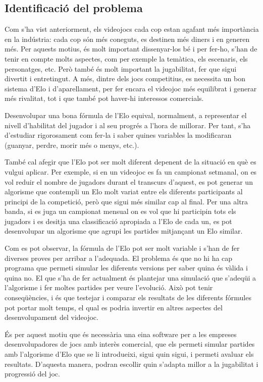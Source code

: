 \documentclass[a4paper]{article}
\begin{document}
\newpage
\subsection{Identificació del problema}
Com s'ha vist anteriorment, els videojocs cada cop estan agafant més importància en la indústria: cada cop són més coneguts, es destinen més diners i en generen més. Per aquests motius, és molt important dissenyar-los bé i per fer-ho, s'han de tenir en compte molts aspectes, com per exemple la temàtica, els escenaris, els personatges, etc. Però també és molt important la jugabilitat, fer que sigui divertit i entretingut. A més, dintre dels jocs competitius, es necessita un bon sistema d'Elo i d'aparellament, per fer encara el videojoc més equilibrat i generar més rivalitat, tot i que també pot haver-hi interessos comercials.

Desenvolupar una bona fórmula de l'Elo equival, normalment, a representar el nivell d'habilitat del jugador i al seu progrés a l'hora de millorar. Per tant, s'ha d'estudiar rigorosament com fer-la i saber quines variables la modificaran (guanyar, perdre, morir més o menys, etc.).

També cal afegir que l'Elo pot ser molt diferent depenent de la situació en què es vulgui aplicar. Per exemple, si en un videojoc es fa un campionat setmanal, on es vol reduir el nombre de jugadors durant el transcurs d'aquest, es pot generar un algorisme que contempli un Elo molt variat entre els diferents participants al principi de la competició, però que sigui més similar cap al final. Per una altra banda, si es juga un campionat mensual on es vol que hi participin tots els jugadors i es desitja una classificació apropiada a l'Elo de cada un, es pot desenvolupar un algorisme que agrupi les partides mitjançant un Elo similar.

Com es pot observar, la fórmula de l'Elo pot ser molt variable i s'han de fer diverses proves per arribar a l'adequada. El problema és que no hi ha cap programa que permeti simular les diferents versions per saber quina és vàlida i quina no. El que s'ha de fer actualment és plantejar una simulació que s'adeqüi a l'algorisme i fer moltes partides per veure l'evolució. Això pot tenir conseqüències, i és que testejar i comparar els resultats de les diferents fórmules pot portar molt temps, el qual es podria invertir en altres aspectes del desenvolupament del videojoc. 

És per aquest motiu que és necessària una eina software per a les empreses desenvolupadores de jocs amb interès comercial, que els permeti simular partides amb l'algorisme d'Elo que se li introdueixi, sigui quin sigui, i permeti avaluar els resultats. D'aquesta manera, podran escollir quin s'adapta millor a la jugabilitat i progressió del joc.
\end{document}
